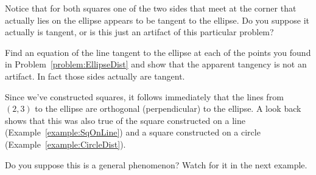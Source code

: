 Notice that for both squares one of the two sides that meet at the corner that actually lies on the
 ellipse appears to be tangent to the ellipse. Do you suppose it
 actually is tangent, or is this just an artifact of this particular
 problem?

 \begin{ProficiencyDrill}
   Find an equation of the line tangent to the ellipse at each of the
   points you found in Problem~\ref{problem:EllipseDist} and show that
   the apparent tangency is not an artifact. In fact those sides
   actually are tangent.
 \end{ProficiencyDrill}

 Since we've constructed squares, it follows immediately that the
 lines from $(2,3)$ to the ellipse are orthogonal (perpendicular) to
 the ellipse. A look back shows that this was also true of the square
 constructed on a line (Example~\ref{example:SqOnLine}) and a square
 constructed on a circle (Example~\ref{example:CircleDist}).

 Do you suppose this is a general phenomenon? Watch for it in the next
example.


